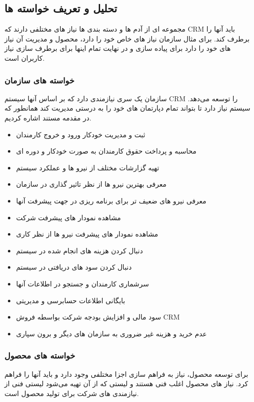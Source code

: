 \subsection{تحلیل و تعریف خواسته ها}
مجموعه ای از آدم ها و دسته بندی ها نیاز های مختلفی دارند که CRM باید آنها را برطرف کند. برای مثال سازمان نیاز های خاص خود را دارد، محصول و مدیریت آن نیاز های خود را دارد برای پیاده سازی
و در نهایت تمام اینها برای برطرف سازی نیاز کاربران است.

\subsubsection{خواسته های سازمان}
سازمان یک سری نیازمندی دارد که بر اساس آنها سیستم CRM را توسعه می‌دهد.
سیستم نیاز دارد تا بتواند تمام دپارتمان های خود را به درستی مدیریت کند همانطور که در مقدمه مستند اشاره کردیم.

\begin{itemize}
	\item ثبت و مدیریت خودکار ورود و خروج کارمندان
	\item محاسبه و پرداخت حقوق کارمندان به صورت خودکار و دوره ای
	\item تهیه گزارشات مختلف از نیرو ها و عملکرد سیستم
	\item معرفی بهترین نیرو ها از نظر تاثیر گذاری در سازمان
	\item معرفی نیرو های ضعیف تر برای برنامه ریزی در جهت پیشرفت آنها
	\item مشاهده نمودار های پیشرفت شرکت
	\item مشاهده نمودار های پیشرفت نیرو ها از نظر کاری
	\item دنبال کردن هزینه های انجام شده در سیستم
	\item دنبال کردن سود های دریافتی در سیستم
	\item سرشماری کارمندان و جستجو در اطلاعات آنها
	\item بایگانی اطلاعات حسابرسی و مدیریتی
	\item سود مالی و افزایش بودجه شرکت بواسطه فروش CRM
	\item عدم خرید و هزینه غیر ضروری به سازمان های دیگر و برون سپاری
\end{itemize}

\subsubsection{خواسته های محصول}

برای توسعه محصول، نیاز به فراهم سازی اجزا مختلفی وجود دارد و باید آنها را فراهم کرد.
نیاز های محصول اغلب فنی هستند و لیستی که از آن تهیه می‌شود لیستی فنی از نیازمندی های شرکت برای تولید محصول است.

